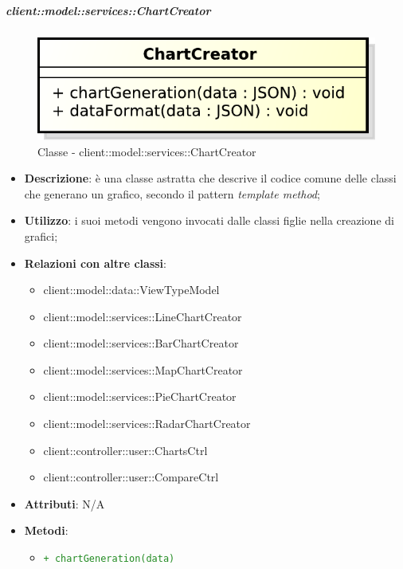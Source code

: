 		\subparagraph{client::model::services::ChartCreator} %
		\label{subp:chartcreator}
			\begin{figure}[htbp]
				\centering
				\centerline{\includegraphics[scale=0.7]{./images/client/classes/model/chart_creator.pdf}}
				\caption{Classe - client::model::services::ChartCreator}
			\end{figure}
			\begin{itemize}
				\item \textbf{Descrizione}: è una classe astratta che descrive il codice comune delle classi che generano un grafico, secondo il pattern \emph{template method};
				\item \textbf{Utilizzo}: i suoi metodi vengono invocati dalle classi figlie nella creazione di grafici;
				\item \textbf{Relazioni con altre classi}:
					\begin{itemize}
						\item client::model::data::ViewTypeModel
						\item client::model::services::LineChartCreator
						\item client::model::services::BarChartCreator
						\item client::model::services::MapChartCreator
						\item client::model::services::PieChartCreator
						\item client::model::services::RadarChartCreator
						\item client::controller::user::ChartsCtrl
						\item client::controller::user::CompareCtrl
					\end{itemize}
				\item \textbf{Attributi}: N/A
				\item \textbf{Metodi}: 
					\begin{itemize}
						\item \textcolor{forestgreen}{\texttt{+ chartGeneration(data)}}
\end{itemize}
\end{itemize}
